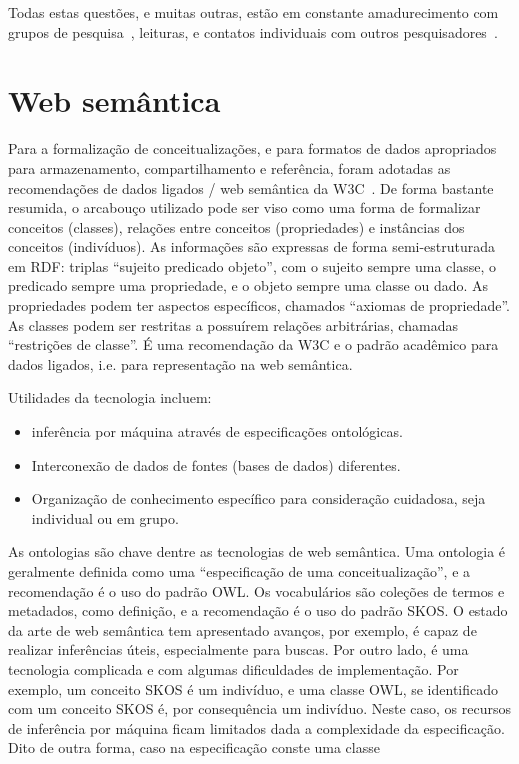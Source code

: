 \documentclass[a4paper,openright,12pt]{report} %
\begin{document}
Todas estas questões, e muitas outras, estão em constante amadurecimento com grupos de pesquisa~\cite{Nexus}, leituras, e contatos individuais com outros pesquisadores~\cite{massimoTexto,massimoEncontro}.

\section{Web semântica}

Para a formalização de conceitualizações, e
para formatos de dados apropriados para armazenamento,
compartilhamento e referência,
foram adotadas as recomendações de dados ligados / web semântica
da W3C~\cite{rdf,owl,rdfs}.
De forma bastante resumida, o arcabouço utilizado pode
ser viso como uma forma de formalizar conceitos (classes), relações
entre conceitos (propriedades) e instâncias dos conceitos (indivíduos).
As informações são expressas de forma semi-estruturada em RDF:
triplas ``sujeito predicado objeto'',
com o sujeito sempre uma classe, o predicado sempre uma propriedade,
e o objeto sempre uma classe ou dado. As propriedades podem ter aspectos
específicos, chamados ``axiomas de propriedade''. As classes podem ser restritas a possuírem relações arbitrárias, chamadas ``restrições de classe''.
É uma recomendação da W3C e o padrão acadêmico para dados ligados, i.e. para representação na web semântica.

Utilidades da tecnologia incluem:
\begin{itemize}
	\item inferência por máquina através de especificações ontológicas. 
	\item Interconexão de dados de fontes (bases de dados) diferentes.
	\item Organização de conhecimento específico para consideração cuidadosa, seja individual ou em grupo.
\end{itemize}

As ontologias são chave dentre as tecnologias de web semântica.
Uma ontologia é geralmente definida como uma ``especificação de
uma conceitualização'', e a recomendação é o uso do padrão OWL.
Os vocabulários são coleções de termos e metadados, como definição,
e a recomendação é o uso do padrão SKOS.
O estado da arte de web semântica tem apresentado avanços,
por exemplo, é capaz de realizar inferências
úteis, especialmente para buscas. Por outro lado, é uma tecnologia
complicada e com algumas dificuldades de implementação.
Por exemplo, um conceito SKOS é um indivíduo, e uma classe OWL,
se identificado com um conceito SKOS é, por consequência um
indivíduo. Neste caso, os recursos de inferência por máquina 
ficam limitados
dada a complexidade da especificação.
Dito de outra forma, caso na especificação conste uma classe
\end{document}
